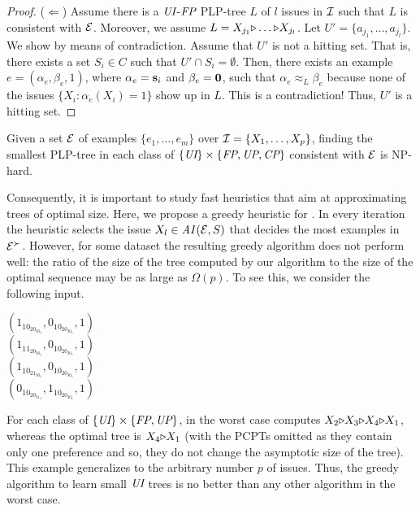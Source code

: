 \begin{proof}
\smallskip
\noindent
	($\Leftarrow$) Assume there is a $\textit{UI}$-$\textit{FP}$ PLP-tree $L$ of $l$ issues in
	$\mathcal{I}$ such that $L$ is consistent with $\mathcal{E}$. Moreover, we assume
	$L=X_{j_1} \mathit{\triangleright} \ldots \mathit{\triangleright} X_{j_l}$.
	Let $U'=\{a_{j_1}, \ldots,a_{j_l}\}$.
	We show by means of contradiction.  Assume that $U'$ is not a hitting set.
	That is, there exists a set $S_i \in C$ such that
	$U' \cap S_i = \emptyset$.
	Then, there exists an example $e=(\alpha_e,\beta_e,1)$, where $\alpha_e=\textbf{s}_i$ 
	and $\beta_e=\textbf{0}$, such that $\alpha_e \approx_L \beta_e$ because
	none of the issues $\{X_i:\alpha_e(X_i)=1\}$ show up in $L$. This is
	a contradiction! Thus, $U'$ is a hitting set.
\end{proof}

\begin{cor}
\label{cor:UIFP_smallest}
	Given a set $\mathcal{E}$ of examples $\{e_1,\ldots,e_m\}$ over $\mathcal{I}=\{X_1,\ldots,X_p\}$,
	finding the smallest PLP-tree in each class of $\{\textit{UI}\} \times \{\textit{FP},\textit{UP},\textit{CP}\}$ 
	consistent with $\mathcal{E}$ is NP-hard.
\end{cor}

Consequently, it is important to study fast heuristics that aim at
approximating trees of optimal size. 
Here, we propose a greedy heuristic for .
In every iteration the heuristic selects the issue $X_l \in \mathit{AI}(\mathcal{E},S)$ that
decides the most examples in $\mathcal{E}^\succ$.
However, for some dataset the resulting greedy algorithm does not perform 
well: the ratio of the size of the tree computed by our algorithm 
to the size of the optimal sequence may be as large as $\Omega(p)$.
To see this, we consider the following input.

\begin{framed}
	\vspace{-0.2cm}
	\noindent $(1_10_20_30_4,0_10_20_30_4,1)$\\
	$(1_11_20_30_4,0_10_20_30_4,1)$\\
	$(1_10_21_30_4,0_10_20_30_4,1)$\\
	$(0_10_20_31_4,1_10_20_30_4,1)$
	\vspace{-0.2cm}
\end{framed}

For each class of $\{\textit{UI}\} \times \{\textit{FP},\textit{UP}\}$,  in the worst 
case computes $X_2 \mathit{\triangleright} X_3 \mathit{\triangleright} X_4 \mathit{\triangleright} X_1$,
whereas the optimal tree is $X_4 \mathit{\triangleright} X_1$ (with
the PCPTs omitted as they contain only one preference and so, they do not
change the asymptotic size of the tree). This example generalizes to the
arbitrary number $p$ of issues. Thus, the greedy algorithm to learn small
$\textit{UI}$ trees is no better than any other algorithm in 
the worst case.


